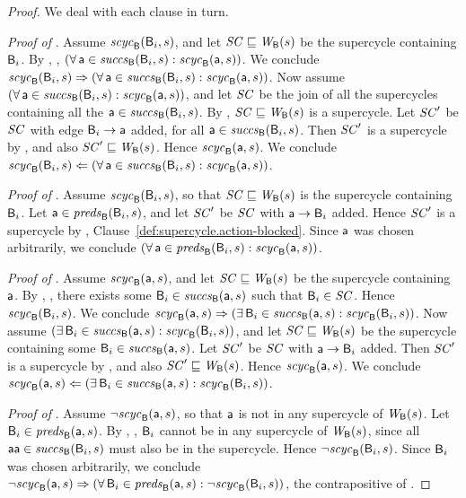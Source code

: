 \begin{proof}
We deal with each clause in turn.


\textit{Proof of }.
%
Assume $\scyc{\B}{s}{\B_i}$, and let $\SC \subg \wfg{\B}{s}$ be the supercycle containing $\B_i$.
By , , $(\fa \act \in \succs{\B}{s}{\B_i} : \scyc{\B}{s}{\act})$.
We conclude
$\scyc{\B}{s}{\B_i} \imp (\fa \act \in \succs{\B}{s}{\B_i} : \scyc{\B}{s}{\act})$.
%
Now assume $(\fa \act \in \succs{\B}{s}{\B_i} : \scyc{\B}{s}{\act})$, and let 
$\SC$ be the join of all the supercycles containing all the $\act \in \succs{\B}{s}{\B_i}$. 
By , $\SC \subg \wfg{\B}{s}$ is a supercycle.
Let $\SC'$ be $\SC$ with edge $\B_i \ar \act$ added, for all 
$\act \in \succs{\B}{s}{\B_i}$.
Then $\SC'$ is a supercycle by 
, and also $\SC' \subg \wfg{\B}{s}$. Hence $\scyc{\B}{s}{\act}$.
We conclude 
$\scyc{\B}{s}{\B_i} \folf (\fa \act \in \succs{\B}{s}{\B_i} : \scyc{\B}{s}{\act})$.




\textit{Proof of }.
%
Assume $\scyc{\B}{s}{\B_i}$, so that $\SC \subg \wfg{\B}{s}$ is the supercycle containing $\B_i$.
Let  $\act \in \preds{\B}{s}{\B_i}$, and let $\SC'$ be $\SC$ with 
$\act \ar \B_i$ added. Hence $\SC'$ is a supercycle by ,
  Clause~\ref{def:supercycle.action-blocked}.
Since $\act$ was chosen arbitrarily, we conclude 
$(\fa \act \in \preds{\B}{s}{\B_i} : \scyc{\B}{s}{\act})$.



\textit{Proof of }.
%
Assume $\scyc{\B}{s}{\act}$, and let $\SC \subg \wfg{\B}{s}$ be the supercycle containing $\act$.  By
, , there exists some
$\B_i \in \succs{\B}{s}{\act}$ such that $\B_i \in \SC$.  Hence $\scyc{\B}{s}{\B_i}$.
We conclude
$\scyc{\B}{s}{\act} \imp (\ex \B_i \in \succs{\B}{s}{\act} : \scyc{\B}{s}{\B_i})$.
%
Now assume $(\ex \B_i \in \succs{\B}{s}{\act} : \scyc{\B}{s}{\B_i})$, and let 
$\SC \subg \wfg{\B}{s}$ be the supercycle containing some $\B_i \in \succs{\B}{s}{\act}$. 
Let $\SC'$ be $\SC$ with $\act \ar \B_i$ added. Then $\SC'$ is a supercycle by 
, and also $\SC' \subg \wfg{\B}{s}$. Hence $\scyc{\B}{s}{\act}$.
We conclude 
$\scyc{\B}{s}{\act} \folf (\ex \B_i \in \succs{\B}{s}{\act} : \scyc{\B}{s}{\B_i})$.


\textit{Proof of }.  
%
Assume $\neg \scyc{\B}{s}{\act}$, so that $\act$ is not in any supercycle of $\wfg{\B}{s}$.
Let $\B_i \in \preds{\B}{s}{\act}$. 
By , , 
$\B_i$ cannot be in any supercycle of $\wfg{\B}{s}$, since all $\actp \in \succs{\B}{s}{\B_i}$ must
also be in the supercycle. Hence $\neg \scyc{\B}{s}{\B_i}$.
Since $\B_i$ was chosen arbitrarily, we conclude
$\neg \scyc{\B}{s}{\act} \imp  (\fa \B_i \in \preds{\B}{s}{\act} : \neg \scyc{\B}{s}{\B_i})$, the
contrapositive of .  
\end{proof}


